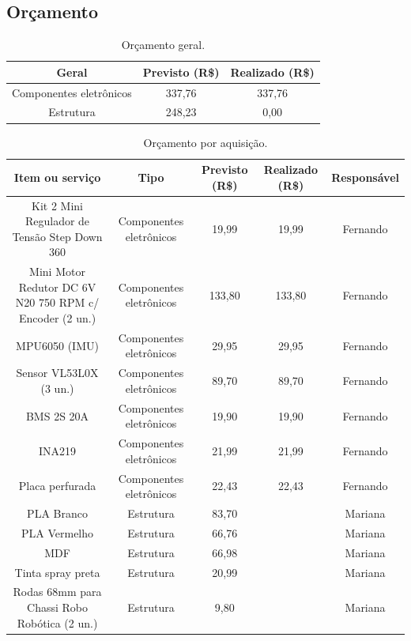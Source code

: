 \begin{landscape}

\chapter{Orçamento}

\begin{table}[htpb]
\begin{center}
\caption{Orçamento geral.}
\begin{tabular}{|c|c|c|}
\hline
\textbf{Geral}          & \textbf{Previsto (R\$)} & \textbf{Realizado (R\$)} \\ \hline
Componentes eletrônicos & 337,76                    & 337,76                     \\ \hline
Estrutura                & 248,23                    & 0,00                     \\ \hline
\end{tabular}
\end{center}
\end{table}

\begin{table}[htpb]
\begin{center}
\caption{Orçamento por aquisição.}
\begin{tabular}{|c|c|c|c|c|}
\hline
\textbf{Item ou serviço} & \textbf{Tipo} & \textbf{Previsto (R\$)} & \textbf{Realizado (R\$)} & \textbf{Responsável} \\ \hline
Kit 2 Mini Regulador de Tensão Step Down 360 & Componentes eletrônicos & 19,99 & 19,99 & Fernando \\ \hline
Mini Motor Redutor DC 6V N20 750 RPM c/ Encoder (2 un.) & Componentes eletrônicos & 133,80 & 133,80 & Fernando \\ \hline
MPU6050 (IMU) & Componentes eletrônicos & 29,95 & 29,95 & Fernando \\ \hline
Sensor VL53L0X (3 un.) & Componentes eletrônicos & 89,70 & 89,70 & Fernando \\ \hline
BMS 2S 20A & Componentes eletrônicos & 19,90 & 19,90 & Fernando \\ \hline
INA219 & Componentes eletrônicos & 21,99 & 21,99 & Fernando \\ \hline
Placa perfurada & Componentes eletrônicos & 22,43 & 22,43 & Fernando \\ \hline
PLA Branco & Estrutura & 83,70 &  & Mariana \\ \hline
PLA Vermelho & Estrutura & 66,76 &  & Mariana \\ \hline
MDF & Estrutura & 66,98 &  & Mariana \\ \hline
Tinta spray preta & Estrutura & 20,99 &  & Mariana \\ \hline
Rodas 68mm para Chassi Robo Robótica (2 un.) & Estrutura & 9,80 &  & Mariana \\ \hline 


\end{tabular}
\end{center}
\end{table}
\end{landscape}
